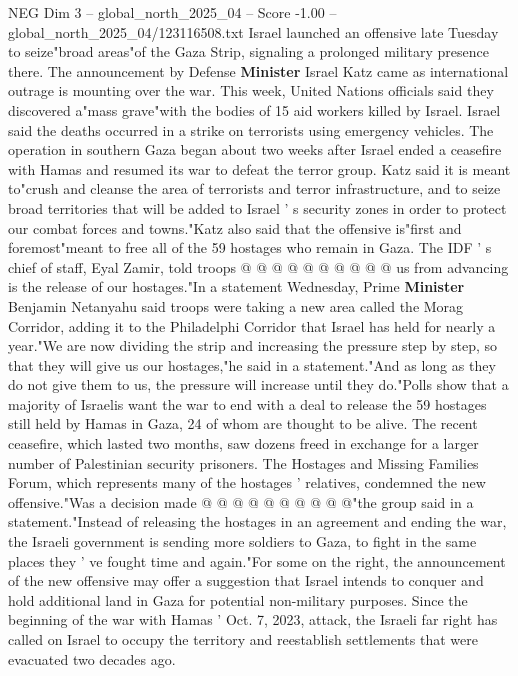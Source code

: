 \begin{textsample}{NEG Dim 3 – global\_north\_2025\_04 – Score -1.00 – global\_north\_2025\_04/123116508.txt}  \label{ex:f3_neg_404}
Israel launched an offensive late Tuesday to seize"broad areas"of the Gaza Strip, signaling a prolonged military presence there.
The announcement by Defense \textbf{Minister} Israel Katz came as international outrage is mounting over the war.
This week, United Nations officials said they discovered a"mass grave"with the bodies of 15 aid workers killed by Israel.
Israel said the deaths occurred in a strike on terrorists using emergency vehicles.
The operation in southern Gaza began about two weeks after Israel ended a ceasefire with Hamas and resumed its war to defeat the terror group.
Katz said it is meant to"crush and cleanse the area of terrorists and terror infrastructure, and to seize broad territories that will be added to Israel ' s security zones in order to protect our combat forces and towns."Katz also said that the offensive is"first and foremost"meant to free all of the 59 hostages who remain in Gaza.
The IDF ' s chief of staff, Eyal Zamir, told troops @ @ @ @ @ @ @ @ @ @ us from advancing is the release of our hostages."In a statement Wednesday, Prime \textbf{Minister} Benjamin Netanyahu said troops were taking a new area called the Morag Corridor, adding it to the Philadelphi Corridor that Israel has held for nearly a year."We are now dividing the strip and increasing the pressure step by step, so that they will give us our hostages,"he said in a statement."And as long as they do not give them to us, the pressure will increase until they do."Polls show that a majority of Israelis want the war to end with a deal to release the 59 hostages still held by Hamas in Gaza, 24 of whom are thought to be alive.
The recent ceasefire, which lasted two months, saw dozens freed in exchange for a larger number of Palestinian security prisoners.
The Hostages and Missing Families Forum, which represents many of the hostages ' relatives, condemned the new offensive."Was a decision made @ @ @ @ @ @ @ @ @ @"the group said in a statement."Instead of releasing the hostages in an agreement and ending the war, the Israeli government is sending more soldiers to Gaza, to fight in the same places they ' ve fought time and again."For some on the right, the announcement of the new offensive may offer a suggestion that Israel intends to conquer and hold additional land in Gaza for potential non-military purposes.
Since the beginning of the war with Hamas ' Oct. 7, 2023, attack, the Israeli far right has called on Israel to occupy the territory and reestablish settlements that were evacuated two decades ago.

\end{textsample}
